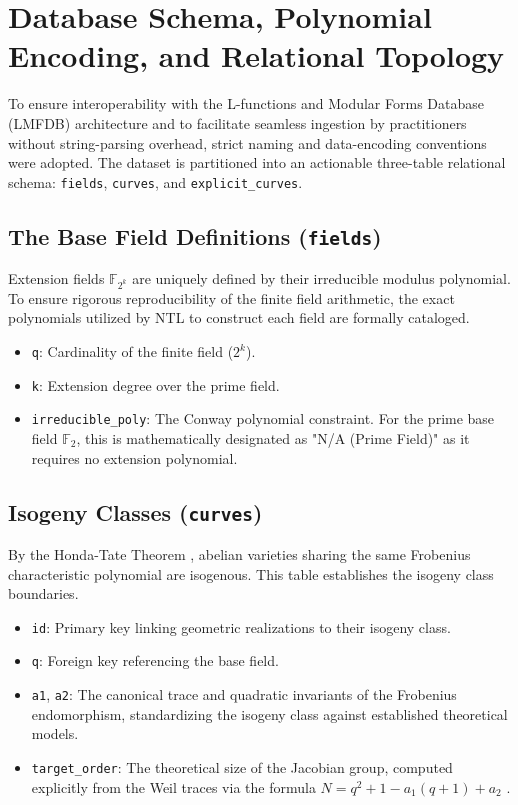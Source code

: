 \documentclass[11pt,letterpaper]{article}
\begin{document}
\section{Database Schema, Polynomial Encoding, and Relational Topology}
To ensure interoperability with the L-functions and Modular Forms Database (LMFDB) architecture and to facilitate seamless ingestion by practitioners without string-parsing overhead, strict naming and data-encoding conventions were adopted. The dataset is partitioned into an actionable three-table relational schema: \texttt{fields}, \texttt{curves}, and \texttt{explicit\_curves}.

\subsection{The Base Field Definitions (\texttt{fields})}
Extension fields $\mathbb{F}_{2^k}$ are uniquely defined by their irreducible modulus polynomial. To ensure rigorous reproducibility of the finite field arithmetic, the exact polynomials utilized by NTL to construct each field are formally cataloged.
\begin{itemize}
\item \texttt{q}: Cardinality of the finite field ($2^k$).
\item \texttt{k}: Extension degree over the prime field.
\item \texttt{irreducible\_poly}: The Conway polynomial constraint. For the prime base field $\mathbb{F}_2$, this is mathematically designated as "N/A (Prime Field)" as it requires no extension polynomial.
\end{itemize}

\subsection{Isogeny Classes (\texttt{curves})}
By the Honda-Tate Theorem \cite{Honda1968}, abelian varieties sharing the same Frobenius characteristic polynomial are isogenous. This table establishes the isogeny class boundaries.
\begin{itemize}
\item \texttt{id}: Primary key linking geometric realizations to their isogeny class.
\item \texttt{q}: Foreign key referencing the base field.
\item \texttt{a1}, \texttt{a2}: The canonical trace and quadratic invariants of the Frobenius endomorphism, standardizing the isogeny class against established theoretical models.
\item \texttt{target\_order}: The theoretical size of the Jacobian group, computed explicitly from the Weil traces via the formula $N = q^2 + 1 - a_1(q + 1) + a_2$ \cite{Waterhouse1969}.
\end{itemize}
\end{document}
